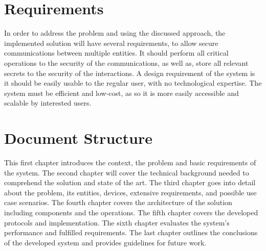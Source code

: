 \section{Requirements}\label{chap:intro:requirements}

In order to address the problem and using the discussed approach, the implemented solution will have several requirements, to allow secure communications between multiple entities.
It should perform all critical operations to the security of the communications, as well as, store all relevant secrets to the security of the interactions.
A design requirement of the system is it should be easily usable to the regular user, with no technological expertise. The system must be efficient and low-cost, as so it is more easily accessible and scalable by interested users.

\section{Document Structure}\label{chap:intro:doc}

This first chapter introduces the context, the problem and basic requirements of the system.
The second chapter will cover the technical background needed to comprehend the solution and state of the art.
The third chapter goes into detail about the problem, its entities, devices, extensive requirements, and possible use case scenarios.
The fourth chapter covers the architecture of the solution including components and the operations.
The fifth chapter covers the developed protocols and implementation. The sixth chapter evaluates the system's performance and fulfilled requirements. The last chapter outlines the conclusions of the developed system and provides guidelines for future work.
